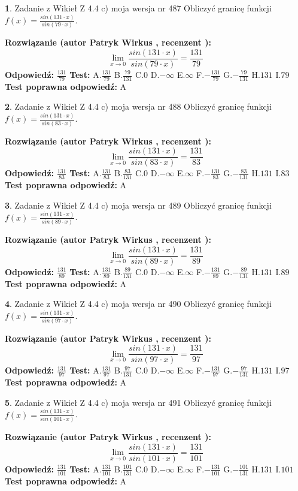 \documentclass[12pt, a4paper]{article}
\theoremstyle{definition} %
\newtheorem{zad}{}
\newcommand{\zadStart}[1]{\begin{zad}#1\newline}
\newcommand{\zadStop}{\end{zad}}
\newcommand{\rozwStart}[2]{\noindent \textbf{Rozwiązanie (autor #1 , recenzent #2): }\newline}
\newcommand{\rozwStop}{\newline}
\newcommand{\odpStart}{\noindent \textbf{Odpowiedź:}\newline}
\newcommand{\odpStop}{\newline}
\newcommand{\testStart}{\noindent \textbf{Test:}\newline}
\newcommand{\testStop}{\newline}
\newcommand{\kluczStart}{\noindent \textbf{Test poprawna odpowiedź:}\newline}
\newcommand{\kluczStop}{\newline}
\begin{document}
\zadStart{Zadanie z Wikieł Z 4.4 c) moja wersja nr 487}
Obliczyć granicę funkcji $f(x)=\frac{sin(131\cdot x)}{sin(79\cdot x)}$.
\zadStop
\rozwStart{Patryk Wirkus}{}
$$\lim\limits_{x\to 0}\frac{sin(131\cdot x)}{sin(79\cdot x)}=
\frac{131}{79}$$
\rozwStop
\odpStart
$\frac{131}{79}$
\odpStop
\testStart
A.$\frac{131}{79}$
B.$\frac{79}{131}$
C.$0$
D.$-\infty$
E.$\infty$
F.$-\frac{131}{79}$
G.$-\frac{79}{131}$
H.$131$
I.$79$
\testStop
\kluczStart
A
\kluczStop



\zadStart{Zadanie z Wikieł Z 4.4 c) moja wersja nr 488}
Obliczyć granicę funkcji $f(x)=\frac{sin(131\cdot x)}{sin(83\cdot x)}$.
\zadStop
\rozwStart{Patryk Wirkus}{}
$$\lim\limits_{x\to 0}\frac{sin(131\cdot x)}{sin(83\cdot x)}=
\frac{131}{83}$$
\rozwStop
\odpStart
$\frac{131}{83}$
\odpStop
\testStart
A.$\frac{131}{83}$
B.$\frac{83}{131}$
C.$0$
D.$-\infty$
E.$\infty$
F.$-\frac{131}{83}$
G.$-\frac{83}{131}$
H.$131$
I.$83$
\testStop
\kluczStart
A
\kluczStop



\zadStart{Zadanie z Wikieł Z 4.4 c) moja wersja nr 489}
Obliczyć granicę funkcji $f(x)=\frac{sin(131\cdot x)}{sin(89\cdot x)}$.
\zadStop
\rozwStart{Patryk Wirkus}{}
$$\lim\limits_{x\to 0}\frac{sin(131\cdot x)}{sin(89\cdot x)}=
\frac{131}{89}$$
\rozwStop
\odpStart
$\frac{131}{89}$
\odpStop
\testStart
A.$\frac{131}{89}$
B.$\frac{89}{131}$
C.$0$
D.$-\infty$
E.$\infty$
F.$-\frac{131}{89}$
G.$-\frac{89}{131}$
H.$131$
I.$89$
\testStop
\kluczStart
A
\kluczStop



\zadStart{Zadanie z Wikieł Z 4.4 c) moja wersja nr 490}
Obliczyć granicę funkcji $f(x)=\frac{sin(131\cdot x)}{sin(97\cdot x)}$.
\zadStop
\rozwStart{Patryk Wirkus}{}
$$\lim\limits_{x\to 0}\frac{sin(131\cdot x)}{sin(97\cdot x)}=
\frac{131}{97}$$
\rozwStop
\odpStart
$\frac{131}{97}$
\odpStop
\testStart
A.$\frac{131}{97}$
B.$\frac{97}{131}$
C.$0$
D.$-\infty$
E.$\infty$
F.$-\frac{131}{97}$
G.$-\frac{97}{131}$
H.$131$
I.$97$
\testStop
\kluczStart
A
\kluczStop



\zadStart{Zadanie z Wikieł Z 4.4 c) moja wersja nr 491}
Obliczyć granicę funkcji $f(x)=\frac{sin(131\cdot x)}{sin(101\cdot x)}$.
\zadStop
\rozwStart{Patryk Wirkus}{}
$$\lim\limits_{x\to 0}\frac{sin(131\cdot x)}{sin(101\cdot x)}=
\frac{131}{101}$$
\rozwStop
\odpStart
$\frac{131}{101}$
\odpStop
\testStart
A.$\frac{131}{101}$
B.$\frac{101}{131}$
C.$0$
D.$-\infty$
E.$\infty$
F.$-\frac{131}{101}$
G.$-\frac{101}{131}$
H.$131$
I.$101$
\testStop
\kluczStart
A
\kluczStop
\end{document}
